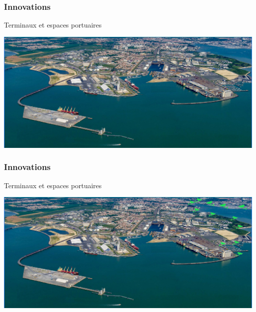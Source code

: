 \begin{frame}
	\frametitle{Innovations}
	Terminaux et espaces portuaires
	\vspace{0.2cm}
	\begin{center}
		\includegraphics[scale=0.35]{images/terminaux_et_espaces_portuaires1.jpg}
	\end{center}
\end{frame}
\begin{frame}
	\frametitle{Innovations}
	Terminaux et espaces portuaires
	\vspace{0.2cm}
	\begin{center}
		\includegraphics[scale=0.35]{images/terminaux_et_espaces_portuaires0.jpg}
	\end{center}
\end{frame}
